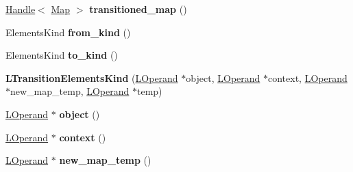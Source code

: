 \begin{DoxyCompactItemize}
\item 
\hyperlink{classv8_1_1internal_1_1_handle}{Handle}$<$ \hyperlink{classv8_1_1internal_1_1_map}{Map} $>$ {\bfseries transitioned\+\_\+map} ()\hypertarget{classv8_1_1internal_1_1_l_transition_elements_kind_a4ffe4230acac522bfd54c3789ccd213b}{}\label{classv8_1_1internal_1_1_l_transition_elements_kind_a4ffe4230acac522bfd54c3789ccd213b}

\item 
Elements\+Kind {\bfseries from\+\_\+kind} ()\hypertarget{classv8_1_1internal_1_1_l_transition_elements_kind_af634084f5d3f05e0700cc8d35a797465}{}\label{classv8_1_1internal_1_1_l_transition_elements_kind_af634084f5d3f05e0700cc8d35a797465}

\item 
Elements\+Kind {\bfseries to\+\_\+kind} ()\hypertarget{classv8_1_1internal_1_1_l_transition_elements_kind_a131f478caf0a117639ee35cd0bdeed59}{}\label{classv8_1_1internal_1_1_l_transition_elements_kind_a131f478caf0a117639ee35cd0bdeed59}

\item 
{\bfseries L\+Transition\+Elements\+Kind} (\hyperlink{classv8_1_1internal_1_1_l_operand}{L\+Operand} $\ast$object, \hyperlink{classv8_1_1internal_1_1_l_operand}{L\+Operand} $\ast$context, \hyperlink{classv8_1_1internal_1_1_l_operand}{L\+Operand} $\ast$new\+\_\+map\+\_\+temp, \hyperlink{classv8_1_1internal_1_1_l_operand}{L\+Operand} $\ast$temp)\hypertarget{classv8_1_1internal_1_1_l_transition_elements_kind_a7657f031166385be3dcf06f6fec20a59}{}\label{classv8_1_1internal_1_1_l_transition_elements_kind_a7657f031166385be3dcf06f6fec20a59}

\item 
\hyperlink{classv8_1_1internal_1_1_l_operand}{L\+Operand} $\ast$ {\bfseries object} ()\hypertarget{classv8_1_1internal_1_1_l_transition_elements_kind_a0257a511e1579fbc39001caf5b0ca855}{}\label{classv8_1_1internal_1_1_l_transition_elements_kind_a0257a511e1579fbc39001caf5b0ca855}

\item 
\hyperlink{classv8_1_1internal_1_1_l_operand}{L\+Operand} $\ast$ {\bfseries context} ()\hypertarget{classv8_1_1internal_1_1_l_transition_elements_kind_aad280c0f1cf8e5ca120cf21b05bd93f0}{}\label{classv8_1_1internal_1_1_l_transition_elements_kind_aad280c0f1cf8e5ca120cf21b05bd93f0}

\item 
\hyperlink{classv8_1_1internal_1_1_l_operand}{L\+Operand} $\ast$ {\bfseries new\+\_\+map\+\_\+temp} ()\hypertarget{classv8_1_1internal_1_1_l_transition_elements_kind_a4a446ffbd6e39017d357109db06dd661}{}\label{classv8_1_1internal_1_1_l_transition_elements_kind_a4a446ffbd6e39017d357109db06dd661}


\end{DoxyCompactItemize}

